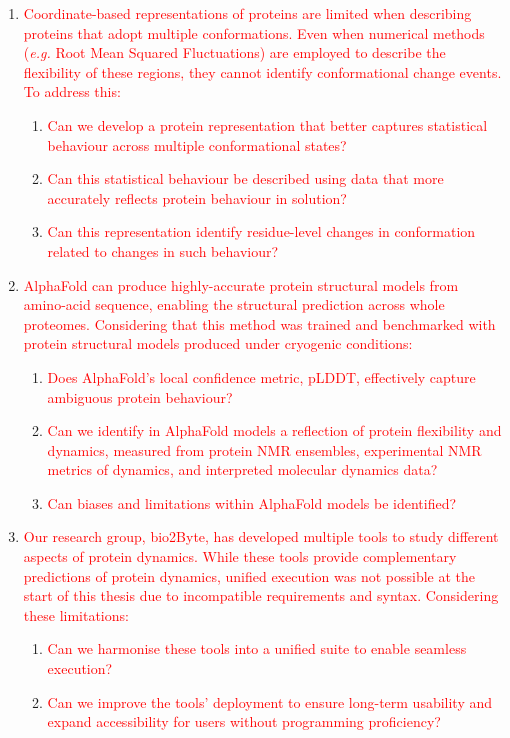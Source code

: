 \begin{enumerate}
    \item \textcolor{red}{Coordinate-based representations of proteins are limited when describing proteins that adopt multiple conformations. Even when numerical methods (\textit{e.g.} Root Mean Squared Fluctuations) are employed to describe the flexibility of these regions, they cannot identify conformational change events. To address this:} 
    \begin{enumerate}
        \item \textcolor{red}{Can we develop a protein representation that better captures statistical behaviour across multiple conformational states?}
        \item \textcolor{red}{Can this statistical behaviour be described using data that more accurately reflects protein behaviour in solution?}
        \item \textcolor{red}{Can this representation identify residue-level changes in conformation related to changes in such behaviour?}
    \end{enumerate}
    
    \item \textcolor{red}{AlphaFold can produce highly-accurate protein structural models from amino-acid sequence, enabling the structural prediction across whole proteomes. Considering that this method was trained and benchmarked with protein structural models produced under cryogenic conditions: }
    \begin{enumerate}
        \item \textcolor{red}{Does AlphaFold's local confidence metric, pLDDT, effectively capture ambiguous protein behaviour?}
        \item \textcolor{red}{Can we identify in AlphaFold models a reflection of protein flexibility and dynamics, measured from protein NMR ensembles, experimental NMR metrics of dynamics, and interpreted molecular dynamics data?}
        \item \textcolor{red}{Can biases and limitations within AlphaFold models be identified?}
    \end{enumerate}

    \item \textcolor{red}{Our research group, bio2Byte, has developed multiple tools to study different aspects of protein dynamics. While these tools provide complementary predictions of protein dynamics, unified execution was not possible at the start of this thesis due to incompatible requirements and syntax. Considering these limitations: }
    \begin{enumerate}
        \item \textcolor{red}{Can we harmonise these tools into a unified suite to enable seamless execution?}
        \item \textcolor{red}{Can we improve the tools' deployment to ensure long-term usability and expand accessibility for users without programming proficiency?}
    \end{enumerate}
\end{enumerate}



